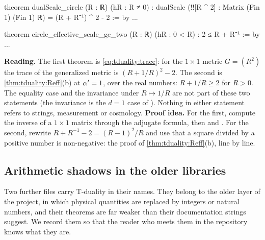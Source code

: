 \begin{leanbox}
\begin{leancode}
theorem dualScale_circle (R : ℝ) (hR : R ≠ 0) :
    dualScale (!![R ^ 2] : Matrix (Fin 1) (Fin 1) ℝ)
      = (R + R⁻¹) ^ 2 - 2 := by ...

theorem circle_effective_scale_ge_two (R : ℝ) (hR : 0 < R) :
    2 ≤ R + R⁻¹ := by ...
\end{leancode}
\textbf{Reading.} The first theorem is \eqref{eq:tduality:trace}: for the $1\times1$ metric
$G=(R^2)$ the trace of the generalized metric is $(R+1/R)^2-2$. The second is
\cref{thm:tduality:Reff}(b) at $\alpha'=1$, over the real numbers: $R+1/R\ge2$ for $R>0$. The
equality case and the invariance under $R\mapsto1/R$ are not part of these two statements
(the invariance is the $d=1$ case of ). Nothing in either statement
refers to strings, measurement or cosmology. \textbf{Proof idea.} For the first, compute
the inverse of a $1\times1$ matrix through the adjugate formula, then  and
. For the second, rewrite $R+R^{-1}-2=(R-1)^2/R$ and use that a square divided by a
positive number is non-negative: the proof of \cref{thm:tduality:Reff}(b), line by line.
\end{leanbox}

\subsection{Arithmetic shadows in the older libraries}

Two further files carry T-duality in their names. They belong to the older layer of the
project, in which physical quantities are replaced by integers or natural numbers, and their
theorems are far weaker than their documentation strings suggest. We record them so that the
reader who meets them in the repository knows what they are.

